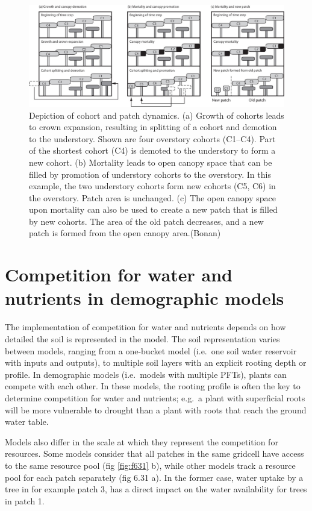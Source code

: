 \documentclass[12pt,oneside]{book}
\begin{document}
\begin{figure}

{\centering \includegraphics[width=0.8\linewidth]{figures/chap6/f630_canopy_dynamics} 

}

\caption{Depiction of cohort and patch dynamics. (a) Growth of cohorts leads to crown expansion, resulting in splitting of a cohort and demotion to the understory. Shown are four overstory cohorts (C1–C4). Part of the shortest cohort (C4) is demoted to the understory to form a new cohort. (b) Mortality leads to open canopy space that can be filled by promotion of understory cohorts to the overstory. In this example, the two understory cohorts form new cohorts (C5, C6) in the overstory. Patch area is unchanged. (c) The open canopy space upon mortality can also be used to create a new patch that is filled by new cohorts. The area of the old patch decreases, and a new patch is formed from the open canopy area.(Bonan)}\label{fig:f630}
\end{figure}

\section{Competition for water and nutrients in demographic
models}\label{competition-for-water-and-nutrients-in-demographic-models}

The implementation of competition for water and nutrients depends on how
detailed the soil is represented in the model. The soil representation
varies between models, ranging from a one-bucket model (i.e.~one soil
water reservoir with inputs and outputs), to multiple soil layers with
an explicit rooting depth or profile. In demographic models (i.e.~models
with multiple PFTs), plants can compete with each other. In these
models, the rooting profile is often the key to determine competition
for water and nutrients; e.g.~a plant with superficial roots will be
more vulnerable to drought than a plant with roots that reach the ground
water table.

Models also differ in the scale at which they represent the competition
for resources. Some models consider that all patches in the same
gridcell have access to the same resource pool (fig \ref{fig:f631} b),
while other models track a resource pool for each patch separately (fig
6.31 a). In the former case, water uptake by a tree in for example patch
3, has a direct impact on the water availability for trees in patch 1.
\end{document}
